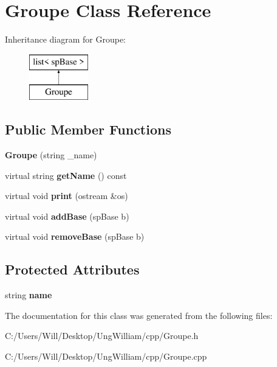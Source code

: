 \hypertarget{class_groupe}{}\section{Groupe Class Reference}
\label{class_groupe}
Inheritance diagram for Groupe\+:\begin{figure}[H]
\begin{center}
\leavevmode
\includegraphics[height=2.000000cm]{class_groupe}
\end{center}
\end{figure}
\subsection*{Public Member Functions}
\begin{DoxyCompactItemize}
\item 
{\bfseries Groupe} (string \+\_\+name)\hypertarget{class_groupe_ad4cd49f43b43c2a0abfc7b283f37e9bc}{}\label{class_groupe_ad4cd49f43b43c2a0abfc7b283f37e9bc}

\item 
virtual string {\bfseries get\+Name} () const \hypertarget{class_groupe_a59bb4c47682eaee83c9e602e77a2fe68}{}\label{class_groupe_a59bb4c47682eaee83c9e602e77a2fe68}

\item 
virtual void {\bfseries print} (ostream \&os)\hypertarget{class_groupe_a9f0f019a28fbe9ba503bfbe184985d2a}{}\label{class_groupe_a9f0f019a28fbe9ba503bfbe184985d2a}

\item 
virtual void {\bfseries add\+Base} (sp\+Base b)\hypertarget{class_groupe_ab1f6b10655bc77873472c72a1b9d06b0}{}\label{class_groupe_ab1f6b10655bc77873472c72a1b9d06b0}

\item 
virtual void {\bfseries remove\+Base} (sp\+Base b)\hypertarget{class_groupe_a79bd65c60555e37ce18e6dc15fa56a60}{}\label{class_groupe_a79bd65c60555e37ce18e6dc15fa56a60}

\end{DoxyCompactItemize}
\subsection*{Protected Attributes}
\begin{DoxyCompactItemize}
\item 
string {\bfseries name}\hypertarget{class_groupe_a45d675668955ce1509a3bbce8fb7e82c}{}\label{class_groupe_a45d675668955ce1509a3bbce8fb7e82c}

\end{DoxyCompactItemize}


The documentation for this class was generated from the following files\+:\begin{DoxyCompactItemize}
\item 
C\+:/\+Users/\+Will/\+Desktop/\+Ung\+William/cpp/Groupe.\+h\item 
C\+:/\+Users/\+Will/\+Desktop/\+Ung\+William/cpp/Groupe.\+cpp\end{DoxyCompactItemize}

